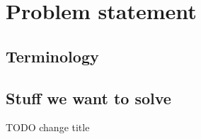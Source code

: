 
 \chapter{Problem statement}

  \section{Terminology}

  \section{Stuff we want to solve}

   TODO change title

